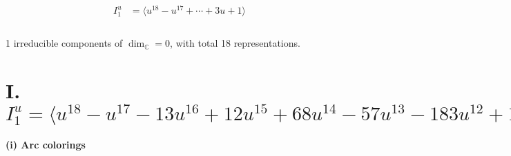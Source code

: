 \documentclass[1p]{elsarticle_modified}
\theoremstyle{definition}
\begin{document}
\begin{align*}
I^u_{1}&=\langle 
u^{18}- u^{17}+\cdots+3 u+1\rangle \\
\\
\end{align*}
\raggedright * 1 irreducible components of $\dim_{\mathbb{C}}=0$, with total 18 representations.\\
\newpage
\renewcommand{\arraystretch}{1}
\centering \section*{I. $I^u_{1}= \langle u^{18}- u^{17}-13 u^{16}+12 u^{15}+68 u^{14}-57 u^{13}-183 u^{12}+136 u^{11}+269 u^{10}-169 u^9-213 u^8+98 u^7+88 u^6-14 u^5-20 u^4-6 u^3- u^2+3 u+1 \rangle$}
\flushleft \textbf{(i) Arc colorings}\\
\end{document}
